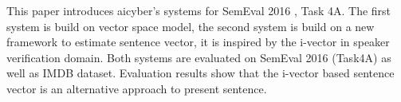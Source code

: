 This paper introduces aicyber's systems for SemEval 2016 , Task 4A. The first system is build on vector space model, the second system is build on a new framework to estimate sentence vector, it is inspired by the i-vector in speaker verification domain. Both systems are evaluated on SemEval 2016 (Task4A) as well as IMDB dataset. Evaluation results show that the i-vector based sentence vector is an alternative approach to present sentence.

